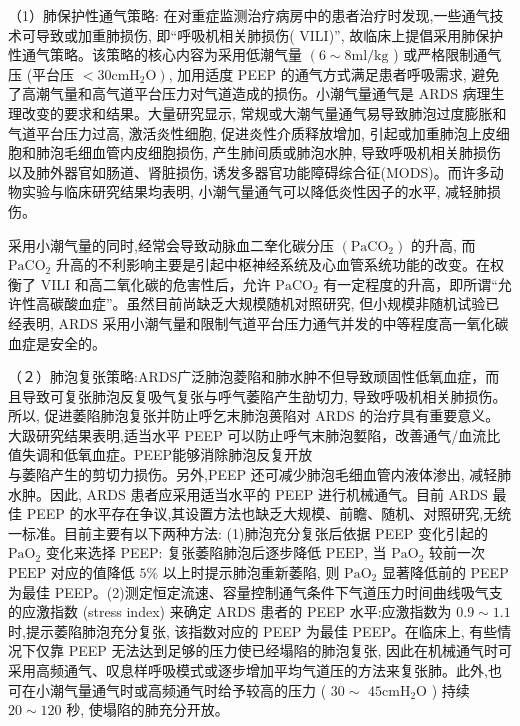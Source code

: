 \documentclass[10pt]{article}
\begin{document}
（1）肺保护性通气策略: 在对重症监测治疗病房中的患者治疗时发现,一些通气技术可导致或加重肺损伤, 即“呼吸机相关肺损伤( VILI)”, 故临床上提倡采用肺保护性通气策略。该策略的核心内容为采用低潮气量 $\left(6 \sim 8 \mathrm{ml} / \mathrm{kg}\right.$ ) 或严格限制通气压 (平台压 $\left.<30 \mathrm{cmH}_{2} \mathrm{O}\right)$, 加用适度 PEEP 的通气方式满足患者呼吸需求, 避免了高潮气量和高气道平台压力对气道造成的损伤。小潮气量通气是 ARDS 病理生理改变的要求和结果。大量研究显示, 常规或大潮气量通气易导致肺泡过度膨胀和气道平台压力过高, 激活炎性细胞, 促进炎性介质释放增加, 引起或加重肺泡上皮细胞和肺泡毛细血管内皮细胞损伤, 产生肺间质或肺泡水肿, 导致呼吸机相关肺损伤以及肺外器官如肠道、肾脏损伤, 诱发多器官功能障碍综合征(MODS)。而许多动物实验与临床研究结果均表明, 小潮气量通气可以降低炎性因子的水平, 减轻肺损伤。

采用小潮气量的同时,经常会导致动脉血二羍化碳分压 $\left(\mathrm{PaCO}_{2}\right)$ 的升高, 而 $\mathrm{PaCO}_{2}$ 升高的不利影响主要是引起中枢神经系统及心血管系统功能的改变。在权衡了 VILI 和高二氧化碳的危害性后，允许 $\mathrm{PaCO}_{2}$ 有一定程度的升高，即所谓“允许性高碳酸血症”。虽然目前尚缺乏大规模随机对照研究, 但小规模非随机试验已经表明, ARDS 采用小潮气量和限制气道平台压力通气并发的中等程度高一氧化碳血症是安全的。

（２）肺泡复张策略:ARDS广泛肺泡菱陷和肺水肿不但导致顽固性低氧血症，而且导致可复张肺泡反复吸气复张与呼气萎陷产生勏切力, 导致呼吸机相关肺损伤。所以, 促进萎陷肺泡复张并防止呼乞末肺泡蒉陷对 ARDS 的治疗具有重要意义。大趿研究结果表明,适当水平 PEEP 可以防止呼气末肺泡㜪陷，改善通气/血流比值失调和低氧血症。PEEP能够消除肺泡反复开放\\
与萎陷产生的剪切力损伤。另外,PEEP 还可减少肺泡毛细血管内液体渗出, 减轻肺水肿。因此, ARDS 患者应采用适当水平的 PEEP 进行机械通气。目前 ARDS 最佳 PEEP 的水平存在争议,其设置方法也缺乏大规模、前瞻、随机、对照研究,无统一标准。目前主要有以下两种方法: (1)肺泡充分复张后依据 PEEP 变化引起的 $\mathrm{PaO}_{2}$ 变化来选择 PEEP: 复张萎陷肺泡后逐步降低 $\mathrm{PEEP}$, 当 $\mathrm{PaO}_{2}$ 较前一次 $\mathrm{PEEP}$ 对应的值降低 $5 \%$ 以上时提示肺泡重新萎陷, 则 $\mathrm{PaO}_{2}$ 显著降低前的 PEEP 为最佳 PEEP。(2)测定恒定流速、容量控制通气条件下气道压力时间曲线吸气支的应激指数 (stress index) 来确定 ARDS 患者的 PEEP 水平:应激指数为 $0.9 \sim 1.1$ 时,提示萎陷肺泡充分复张, 该指数对应的 PEEP 为最佳 PEEP。在临床上, 有些情况下仅靠 PEEP 无法达到足够的压力使已经塌陷的肺泡复张, 因此在机械通气时可采用高频通气、叹息样呼吸模式或逐步增加平均气道压的方法来复张肺。此外,也可在小潮气量通气时或高频通气时给予较高的压力 ( $30 \sim$ $45 \mathrm{cmH}_{2} \mathrm{O}$ ) 持续 $20 \sim 120$ 秒, 使塌陷的肺充分开放。
\end{document}
